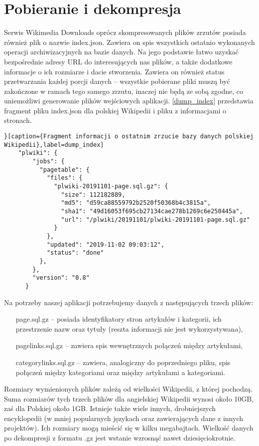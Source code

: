 \section{Pobieranie i dekompresja}
Serwis Wikimedia Downloads oprócz skompresowanych plików zrzutów posiada również plik o nazwie index.json. Zawiera on spis wszystkich ostatnio wykonanych operacji archiwizacyjnych na bazie danych. Na jego podstawie łatwo uzyskać bezpośrednie adresy URL do interesujących nas plików, a także dodatkowe informacje o ich rozmiarze i dacie stworzenia. Zawiera on również status przetwarzania każdej porcji danych – wszystkie pobierane pliki muszą być zakończone w ramach tego samego zrzutu, inaczej nie będą ze sobą zgodne, co uniemożliwi generowanie plików wejściowych aplikacji. \ref{dump_index} przedstawia fragment pliku index.json dla polskiej Wikipedii i pliku z informacjami o stronach.

\begin{lstlisting}[frame=single]}[caption={Fragment informacji o ostatnim zrzucie bazy danych polskiej Wikipedii},label=dump_index]
    "plwiki": {
        "jobs": {
          "pagetable": {
            "files": {
              "plwiki-20191101-page.sql.gz": {
                "size": 112182889,
                "md5": "d59ca88559792b2520f50368b4c3815a",
                "sha1": "49d16053f695cb27134cae278b1269c6e250445a",
                "url": "/plwiki/20191101/plwiki-20191101-page.sql.gz"
              }
            },
            "updated": "2019-11-02 09:03:12",
            "status": "done"
          },
        },
        "version": "0.8"
      }      
\end{lstlisting}

Na potrzeby naszej aplikacji potrzebujemy danych z następujących trzech plików:

\begin{enumerate}[label=\textbullet]
    \item[page.sql.gz] – posiada identyfikatory stron artykułów i kategorii, ich przestrzenie nazw oraz tytuły (reszta informacji nie jest wykorzystywana),
    \item[pagelinks.sql.gz] – zawiera spis wewnętrznych połączeń między artykułami,
    \item[categorylinks.sql.gz] – zawiera, analogiczny do poprzedniego pliku, spis połączeń między kategoriami oraz między artykułami a kategoriami.
\end{enumerate}

Rozmiary wymienionych plików zależą od wielkości Wikipedii, z której pochodzą. Suma rozmiarów tych trzech plików dla angielskiej Wikipedii wynosi około 10GB, zaś dla Polskiej około 1GB. Istnieje także wiele innych, drobniejszych encyklopedii (w mniej popularnych językach oraz zawierających dane z innych projektów). Ich rozmiary mogą mieścić się w kilku megabajtach. Wielkość danych po dekompresji z formatu .gz jest wstanie wzrosnąć nawet dziesięciokrotnie.
